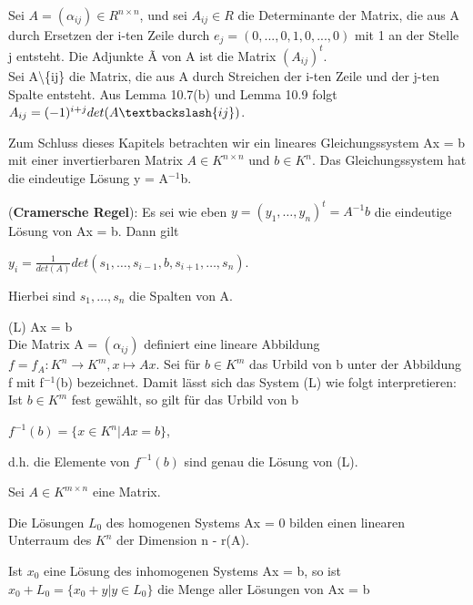 \begin{definition}
Sei $A = (\alpha_{ij}) \in R^{n \times n}$, und sei $A_{ij} \in R$ die Determinante der Matrix, die aus A durch Ersetzen der i-ten Zeile durch $e_j = (0,...,0,1,0,...,0)$ mit 1 an der Stelle j entsteht. Die Adjunkte \~{A} von A ist die Matrix $(A_{ij})^t$.\\
Sei A\textbackslash\{ij\} die Matrix, die aus A durch Streichen der i-ten Zeile und der j-ten Spalte entsteht. Aus Lemma 10.7(b) und Lemma 10.9 folgt $A_{ij} =(-1)^{i+j} det(A\textbackslash\{ij\})$.
\end{definition}

Zum Schluss dieses Kapitels betrachten wir ein lineares Gleichungssystem Ax = b mit einer invertierbaren Matrix $A \in K^{n \times n}$ und $b \in K^n$. Das Gleichungssystem hat die eindeutige Lösung y = A$^{-1}$b.

\begin{theorem}
(\textbf{Cramersche Regel}): Es sei wie eben $y = (y_1, …, y_n)^t = A^{-1}b$ die eindeutige Lösung von Ax = b. Dann gilt
\begin{center}
$y_i = \frac{1}{det(A)} det(s_1, …, s_{i-1}, b, s_{i+1}, …, s_n)$.
\end{center}
Hierbei sind $s_1, …, s_n$ die Spalten von A.
\end{theorem}

(L)  Ax = b\\
Die Matrix A = $(\alpha_{ij})$ definiert eine lineare Abbildung $f = f_A: K^n \to K^m, x \mapsto Ax$. Sei für $b \in K^m$ das Urbild von b unter der Abbildung f mit f$^{-1}$(b) bezeichnet. Damit lässt sich das System (L) wie folgt interpretieren: Ist $b \in K^m$ fest gewählt, so gilt für das Urbild von b
\begin{center}
$f^{-1}(b) = \{x \in K^n | Ax = b\}$,
\end{center}
d.h. die Elemente von $f^{-1}(b)$ sind genau die Lösung von (L).

\begin{lemma}
Sei $A \in K^{m \times n}$ eine Matrix.
\begin{compactenum}
\item Die Lösungen $L_0$ des homogenen Systems Ax = 0 bilden einen linearen Unterraum des $K^n$ der Dimension n - r(A).
\item Ist $x_0$ eine Lösung des inhomogenen Systems Ax = b, so ist $x_0 + L_0 = \{x_0 +y | y \in L_0\}$ die Menge aller Lösungen von Ax = b
\end{compactenum}
\end{lemma}

